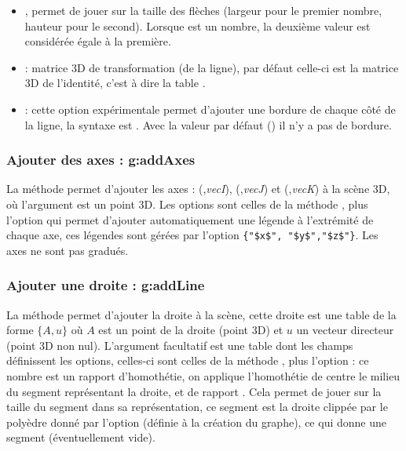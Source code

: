 \begin{itemize}
        \item {}, permet de jouer sur la taille des flèches (largeur pour le premier nombre, hauteur pour le second). Lorsque  est un nombre, la deuxième valeur est considérée égale à la première.
        
        \item {} : matrice 3D de transformation (de la ligne), par défaut celle-ci est la matrice 3D de l'identité, c'est à dire la table .
        
        \item {} : cette option expérimentale permet d'ajouter une bordure de chaque côté de la ligne, la syntaxe est . Avec la valeur par défaut (\nil) il n'y a pas de bordure.
    \end{itemize}
    
\subsubsection{Ajouter des axes : g:addAxes}

La méthode  permet d'ajouter les axes : (,\emph{vecI}), (,\emph{vecJ}) et (,\emph{vecK}) à la scène 3D, où l'argument  est un point 3D. Les options sont celles de la méthode , plus l'option  qui permet d'ajouter automatiquement une légende à l'extrémité de chaque axe, ces légendes sont gérées par l'option \verb|{"$x$", "$y$","$z$"}|. Les axes ne sont pas gradués.
    
\subsubsection{Ajouter une droite : g:addLine}

La méthode  permet d'ajouter la droite  à la scène, cette droite est une table de la forme $\{A,u\}$ où $A$ est un point de la droite (point 3D) et $u$ un vecteur directeur (point 3D non nul).  L'argument facultatif  est une table dont les champs définissent les options, celles-ci sont celles de la méthode , plus l'option  : ce nombre est un rapport d'homothétie, on applique l'homothétie de centre le milieu du segment représentant la droite, et de rapport . Cela permet de jouer sur la taille du segment dans sa représentation, ce segment est la droite clippée par le polyèdre donné par l'option  (définie à la création du graphe), ce qui donne une segment (éventuellement vide).

